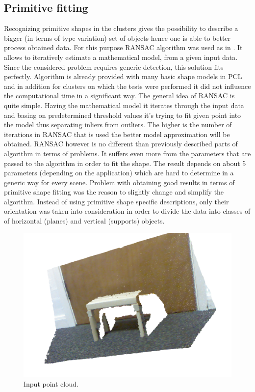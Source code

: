 \documentclass[fontsize=12pt]{article}
\begin{document}
\subsection{Primitive fitting}
Recognizing primitive shapes in the clusters gives the possibility to describe a bigger (in terms of type variation) set of objects hence one is able to better process obtained data. For this purpose RANSAC algorithm was used as in \cite{pap1}. It allows to iteratively estimate a mathematical model, from a given input data. Since the considered problem requires generic detection, this solution fits perfectly. Algorithm is already provided with many basic shape models in PCL and in addition for clusters on which the tests were performed it did not influence the computational time in a significant way.
\newline
\indent The general idea of RANSAC is quite simple. Having the mathematical model it iterates through the input data and basing on predetermined threshold values it's trying to fit given point into the model thus separating inliers from outliers. The higher is the number of iterations in RANSAC that is used the better model approximation will be obtained.
\newline
\indent RANSAC however is no different than previously described parts of algorithm in terms of problems. It suffers even more from the parameters that are passed to the algorithm in order to fit the shape. The result depends on about 5 parameters (depending on the application) which are hard to determine in a generic way for every scene. Problem with obtaining good results in terms of primitive shape fitting was the reason to slightly change and simplify the algorithm. Instead of using primitive shape specific descriptions, only their orientation was taken into consideration in order to divide the data into classes of of horizontal (planes) and vertical (supports) objects.  
\begin{figure}
  \begin{center}
    \includegraphics[scale=0.5]{images/rgbTable}
    \caption{Input point cloud.}
    \label{fig:rgbTable}
  \end{center}
\end{figure}
\end{document}

